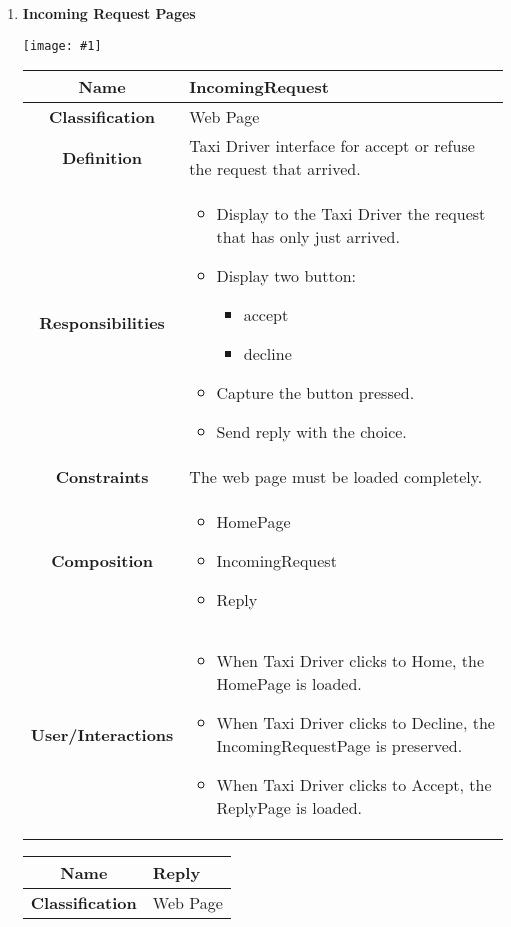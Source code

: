 \documentclass[11pt, a4paper,titlepage]{article}
\newcommand{\image}[1]{
	\begin{center}
		\noindent \texttt{[image: \#1]}
	\end{center}
	}
\begin{document}
\begin{enumerate}
\newpage
\item \textbf{Incoming Request Pages}\\
\image{page_incomingrequest.png}
\begin{tabularx}{\textwidth}{| c | X |}
	\hline
	\textbf{Name} &
	IncomingRequest
	\\
	\hline
	\textbf{Classification} &
	Web Page
	\\
	\hline
	\textbf{Definition} &
	Taxi Driver interface for accept or refuse the request that arrived.\\
	\hline
	\textbf{Responsibilities} &
	\begin{itemize}
		\item Display to the Taxi Driver the request that has only just arrived.
		\item Display two button:
		\begin{itemize}
			\item accept
			\item decline
		\end{itemize} 	
		\item Capture the button pressed.
		\item Send reply with the choice.	
	\end{itemize}
	\\
	\hline
	\textbf{Constraints} & The web page must be loaded completely.
	\\
	\hline
	\textbf{Composition} &
	\begin{itemize}
		\item HomePage
		\item IncomingRequest
		\item Reply
	\end{itemize}
	\\
	\hline
	\textbf{User/Interactions} &
	\begin{itemize}
		\item When Taxi Driver clicks to Home, the HomePage is loaded.
		\item When Taxi Driver clicks to Decline, the IncomingRequestPage is preserved.
		\item When Taxi Driver clicks to Accept, the ReplyPage is loaded.
	\end{itemize}
	\\
	\hline 
\end{tabularx}
\begin{tabularx}{\textwidth}{| c | X |}
	\hline
	\textbf{Name} &
	Reply
	\\
	\hline
	\textbf{Classification} &
	Web Page
	\\

\end{tabularx}
\end{enumerate}
\end{document}
